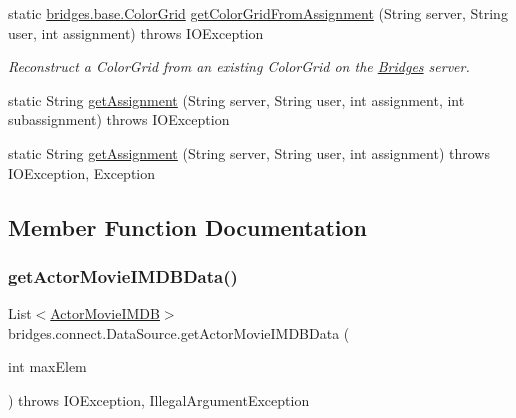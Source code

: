 \begin{DoxyCompactItemize}
static \hyperlink{classbridges_1_1base_1_1_color_grid}{bridges.\+base.\+Color\+Grid} \hyperlink{classbridges_1_1connect_1_1_data_source_acd2dd966d1ef624c9e31c1dab69aaf9b}{get\+Color\+Grid\+From\+Assignment} (String server, String user, int assignment)  throws I\+O\+Exception 
\begin{DoxyCompactList}\small\item\em Reconstruct a Color\+Grid from an existing Color\+Grid on the \hyperlink{classbridges_1_1connect_1_1_bridges}{Bridges} server. \end{DoxyCompactList}\item 
static String \hyperlink{classbridges_1_1connect_1_1_data_source_ab95eceb71fd0ff1cdc5558a53d47d5c4}{get\+Assignment} (String server, String user, int assignment, int subassignment)  throws I\+O\+Exception 
\item 
static String \hyperlink{classbridges_1_1connect_1_1_data_source_ac3487262c29278bf2e16da45adf3bc89}{get\+Assignment} (String server, String user, int assignment)  throws I\+O\+Exception, Exception 
\end{DoxyCompactItemize}


\subsection{Member Function Documentation}
\mbox{\label{classbridges_1_1connect_1_1_data_source_ab18803b850f3c867306723d1a1be337e}} 
\subsubsection{\texorpdfstring{get\+Actor\+Movie\+I\+M\+D\+B\+Data()}{getActorMovieIMDBData()}}
{\footnotesize\ttfamily List$<$\hyperlink{classbridges_1_1data__src__dependent_1_1_actor_movie_i_m_d_b}{Actor\+Movie\+I\+M\+DB}$>$ bridges.\+connect.\+Data\+Source.\+get\+Actor\+Movie\+I\+M\+D\+B\+Data (\begin{DoxyParamCaption}\item[{int}]{max\+Elem }\end{DoxyParamCaption}) throws I\+O\+Exception, Illegal\+Argument\+Exception}

